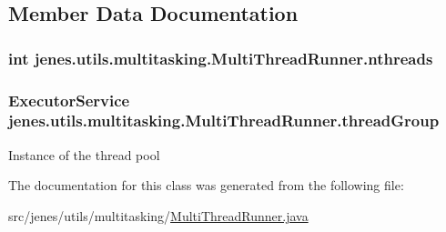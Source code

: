 \subsection{Member Data Documentation}
\hypertarget{classjenes_1_1utils_1_1multitasking_1_1_multi_thread_runner_aa20fe700a6b2abd3694b4a1d5629db8f}{
\subsubsection[{nthreads}]{\setlength{\rightskip}{0pt plus 5cm}int jenes.\-utils.\-multitasking.\-Multi\-Thread\-Runner.\-nthreads\hspace{0.3cm}{\ttfamily [protected]}}}\label{classjenes_1_1utils_1_1multitasking_1_1_multi_thread_runner_aa20fe700a6b2abd3694b4a1d5629db8f}
\hypertarget{classjenes_1_1utils_1_1multitasking_1_1_multi_thread_runner_afd9939cc7a261bd4bb6c8f3de6f58337}{
\subsubsection[{thread\-Group}]{\setlength{\rightskip}{0pt plus 5cm}Executor\-Service jenes.\-utils.\-multitasking.\-Multi\-Thread\-Runner.\-thread\-Group\hspace{0.3cm}{\ttfamily [protected]}}}\label{classjenes_1_1utils_1_1multitasking_1_1_multi_thread_runner_afd9939cc7a261bd4bb6c8f3de6f58337}
Instance of the thread pool 

The documentation for this class was generated from the following file\-:\begin{DoxyCompactItemize}
\item 
src/jenes/utils/multitasking/\hyperlink{_multi_thread_runner_8java}{Multi\-Thread\-Runner.\-java}\end{DoxyCompactItemize}
